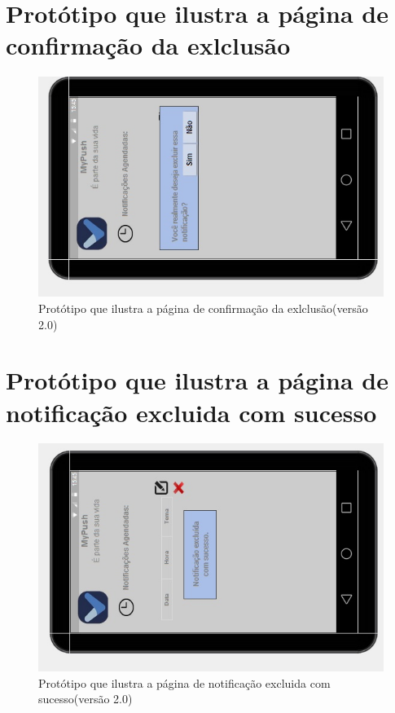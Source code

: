\begin{apendicesenv}
      \section*{Protótipo que ilustra a página de confirmação da exlclusão}

    \begin{figure}[!htbp]
      \centering
      \includegraphics[scale=0.5, angle=-90]{editaveis/figuras/prototipo_alta_fidelidade_v2/2_11}
      \caption{Protótipo que ilustra a página de confirmação da exlclusão(versão 2.0)}
      \label{v2}
    \end{figure}
    
      \section*{Protótipo que ilustra a página de notificação excluida com sucesso}

    \begin{figure}[!htbp]
      \centering
      \includegraphics[scale=0.5, angle=-90]{editaveis/figuras/prototipo_alta_fidelidade_v2/2_12}
      \caption{Protótipo que ilustra a página de notificação excluida com sucesso(versão 2.0)}
      \label{v2}
    \end{figure}
    

\end{apendicesenv}
